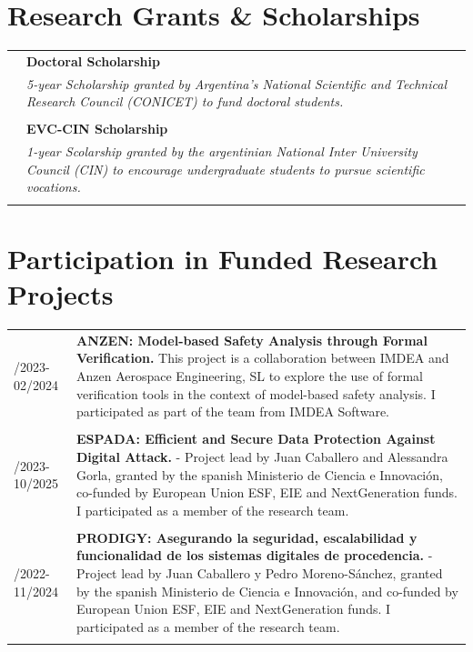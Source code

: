 \documentclass[a4paper,10pt]{article} %
\begin{document}
\section{Research Grants \& Scholarships}
\begin{longtable}{>{\raggedleft\arraybackslash}p{} p{}}

2017 & \textbf{Doctoral Scholarship} \\ 
& \textit{5-year Scholarship granted by Argentina's National Scientific and Technical Research Council (CONICET) to fund doctoral students.} \\ & \\

2016 & \textbf{EVC-CIN Scholarship} \\ 
& \textit{1-year Scolarship granted by the argentinian National Inter University Council (CIN) to encourage undergraduate students to pursue scientific vocations.} \\ & \\

\end{longtable}

\section{Participation in Funded Research Projects}
\begin{longtable}{>{\raggedleft\arraybackslash}p{} p{}}

11/2023-02/2024 & \textbf{ANZEN: Model-based Safety Analysis through Formal Verification.} This project is a collaboration between IMDEA and Anzen Aerospace Engineering, SL to explore the use of formal verification tools in the context of model-based safety analysis. I participated as part of the team from IMDEA Software. \\ & \\

09/2023-10/2025 & \textbf{ESPADA: Efficient and Secure Data Protection Against Digital Attack.} - Project lead by Juan Caballero and Alessandra Gorla, granted by the spanish Ministerio de Ciencia e Innovación, co-funded by European Union ESF, EIE and NextGeneration funds. I participated as a member of the research team. \\ & \\

12/2022-11/2024 & \textbf{PRODIGY: Asegurando la seguridad, escalabilidad y funcionalidad de los sistemas digitales de procedencia.} - Project lead by Juan Caballero y Pedro Moreno-Sánchez, granted by the spanish Ministerio de Ciencia e Innovación, and co-funded by European Union ESF, EIE and NextGeneration funds. I participated as a member of the research team. \\ & \\

\end{longtable}
\end{document}
